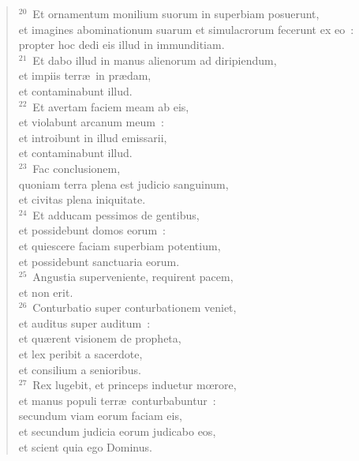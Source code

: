 \begin{flushleft}
\begin{verse}
${}^{20}$~Et ornamentum monilium suorum in superbiam posuerunt,\\ et imagines abominationum suarum et simulacrorum fecerunt ex eo~:\\ propter hoc dedi eis illud in immunditiam.\\
${}^{21}$~Et dabo illud in manus alienorum ad diripiendum,\\ et impiis terr\ae\ in pr\ae dam,\\ et contaminabunt illud.\\
${}^{22}$~Et avertam faciem meam ab eis,\\ et violabunt arcanum meum~:\\ et introibunt in illud emissarii,\\ et contaminabunt illud.\\
${}^{23}$~Fac conclusionem,\\ quoniam terra plena est judicio sanguinum,\\ et civitas plena iniquitate.\\
${}^{24}$~Et adducam pessimos de gentibus,\\ et possidebunt domos eorum~:\\ et quiescere faciam superbiam potentium,\\ et possidebunt sanctuaria eorum.\\
${}^{25}$~Angustia superveniente, requirent pacem,\\ et non erit.\\
${}^{26}$~Conturbatio super conturbationem veniet,\\ et auditus super auditum~:\\ et qu\ae rent visionem de propheta,\\ et lex peribit a sacerdote,\\ et consilium a senioribus.\\
${}^{27}$~Rex lugebit, et princeps induetur mœrore,\\ et manus populi terr\ae\ conturbabuntur~:\\ secundum viam eorum faciam eis,\\ et secundum judicia eorum judicabo eos,\\ et scient quia ego Dominus.\end{verse}\end{flushleft}



